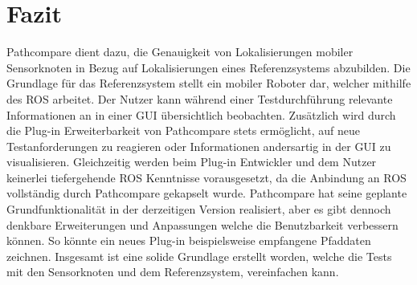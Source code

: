 \chapter{Fazit}
\label{sec:conclusion}
Pathcompare dient dazu, die Genauigkeit von Lokalisierungen mobiler
Sensorknoten in Bezug auf Lokalisierungen eines Referenzsystems abzubilden.
Die Grundlage für das Referenzsystem stellt ein mobiler Roboter dar, welcher
mithilfe des ROS arbeitet. Der Nutzer kann während einer
Testdurchführung relevante Informationen an in einer GUI übersichtlich beobachten. 
Zusätzlich wird durch die Plug-in Erweiterbarkeit von Pathcompare stets
ermöglicht, auf neue Testanforderungen zu reagieren oder Informationen
andersartig in der GUI zu visualisieren. Gleichzeitig werden beim Plug-in
Entwickler und dem Nutzer keinerlei tiefergehende ROS Kenntnisse vorausgesetzt,
da die Anbindung an ROS vollständig durch Pathcompare gekapselt wurde. 
Pathcompare hat seine geplante Grundfunktionalität in der derzeitigen Version
realisiert, aber es gibt dennoch denkbare Erweiterungen und Anpassungen welche die
Benutzbarkeit verbessern können. So könnte ein neues Plug-in beispielsweise
empfangene Pfaddaten zeichnen. Insgesamt ist eine solide Grundlage erstellt
worden, welche die Tests mit den Sensorknoten und dem Referenzsystem,
vereinfachen kann.

